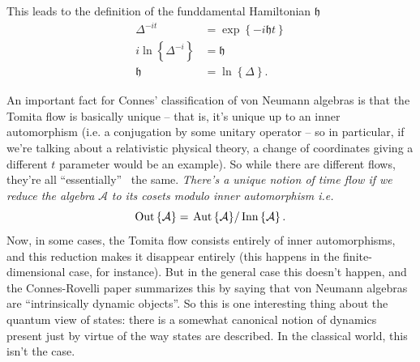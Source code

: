 \documentclass[aps,preprint]{revtex4}%
\begin{document}
This leads to the definition of the funddamental Hamiltonian $\mathfrak{h}$
\begin{align}
\mathcal{\Delta}^{-it}  & =\exp\left\{  -i\mathfrak{h}t\right\}  \\
i\ln\left\{  \mathcal{\Delta}^{-i}\right\}    & =\mathfrak{h}\\
\mathfrak{h}  & \mathfrak{=}\ln\left\{  \mathcal{\Delta}\right\}  .
\end{align}


An important fact for Connes' classification of von Neumann algebras is that
the Tomita flow is basically unique -- that is, it's unique up to an inner
automorphism (i.e. a conjugation by some unitary operator -- so in particular,
if we're talking about a relativistic physical theory, a change of coordinates
giving a different $t$ parameter would be an example). So while there are
different flows, they're all \textquotedblleft essentially\textquotedblright%
\ the same. \emph{There's a unique notion of time flow if we reduce the
algebra }$\mathcal{A}$\emph{ to its cosets modulo inner automorphism i.e.}%
\begin{equation}
\operatorname*{Out}\left\{  \mathcal{A}\right\}  =\left.  \operatorname{Aut}%
\left\{  \mathcal{A}\right\}  \right/  \operatorname*{Inn}\left\{
\mathcal{A}\right\}  .
\end{equation}
Now, in some cases, the Tomita flow consists entirely of inner automorphisms,
and this reduction makes it disappear entirely (this happens in the
finite-dimensional case, for instance). But in the general case this doesn't
happen, and the Connes-Rovelli paper summarizes this by saying that von
Neumann algebras are \textquotedblleft intrinsically dynamic
objects\textquotedblright. So this is one interesting thing about the quantum
view of states: there is a somewhat canonical notion of dynamics present just
by virtue of the way states are described. In the classical world, this isn't
the case.
\end{document}
